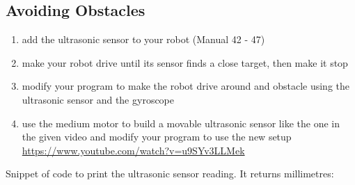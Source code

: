 \documentclass{article}
\begin{document}
  \subsection{Avoiding Obstacles}
  \begin{enumerate}
    \item add the ultrasonic sensor to your robot (Manual 42 - 47)
    \item make your robot drive until its sensor finds a close target, then make it stop
    \item modify your program to make the robot drive around and obstacle using the ultrasonic
        sensor and the gyroscope
    \item use the medium motor to build a movable ultrasonic sensor like the one
        in the given video and modify your program to use the new setup \\
        \url{https://www.youtube.com/watch?v=u9SYv3LLMek}
  \end{enumerate}

  Snippet of code to print the ultrasonic sensor reading. It returns millimetres:
  \inputminted{python}{../src/python/sonar.py}
\end{document}
